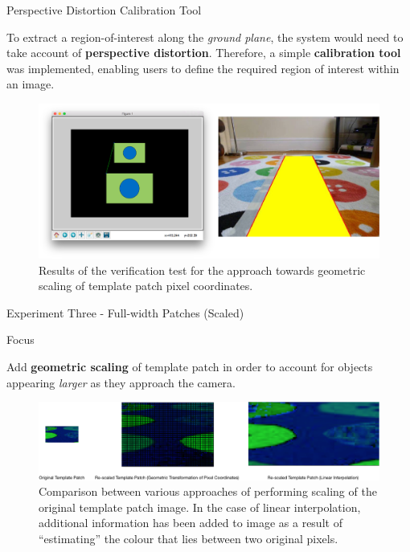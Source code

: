 \documentclass[10pt, compress]{beamer}
\begin{document}
\begin{frame}{Perspective Distortion Calibration Tool}

\vspace{-5pt}

To extract a region-of-interest along the \textit{ground plane}, the system would need to take account of \textbf{perspective distortion}. Therefore, a simple \textbf{calibration tool} was implemented, enabling users to define the required region of interest within an image.

 \begin{figure}[ht!]
\centering
\includegraphics[scale=0.2]{calib_tool}
\vspace{-10pt}
 \caption{Results of the verification test for the approach towards geometric scaling of template patch pixel coordinates.}
\end{figure}

\end{frame}

\begin{frame}{Experiment Three - Full-width Patches (Scaled)}

\begin{block}{Focus}

Add \textbf{geometric scaling} of template patch in order to account for objects appearing \textit{larger} as they approach the camera. 
	
\end{block}
 \vspace{5pt}
  \begin{figure}[ht!]
\centering
\includegraphics[scale=0.28]{scaling_types_new}
\vspace{5pt}
 \caption{Comparison between various approaches of performing scaling of the original template patch image. In the case of linear interpolation, additional information has been added to image as a result of “estimating” the colour that lies between two original pixels.}
\end{figure}

\end{frame}
\end{document}
